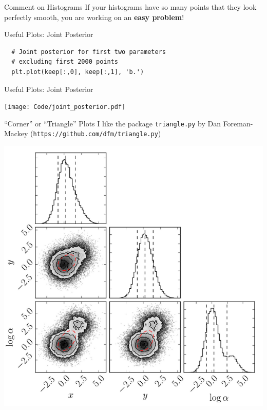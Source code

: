 \begin{frame}[t]{Comment on Histograms}
If your histograms have so many points that they look perfectly smooth, you
are working on an {\bf easy problem}!
\end{frame}


\begin{frame}[t, fragile]{Useful Plots: Joint Posterior}
\begin{verbatim}
  # Joint posterior for first two parameters
  # excluding first 2000 points
  plt.plot(keep[:,0], keep[:,1], 'b.')
\end{verbatim}
\end{frame}

\begin{frame}[t]{Useful Plots: Joint Posterior}
\begin{center}
\texttt{[image: Code/joint\_posterior.pdf]}
\end{center}
\end{frame}


\begin{frame}[t]{``Corner'' or ``Triangle'' Plots}
I like the package {\tt triangle.py} by Dan Foreman-Mackey
({\tt https://github.com/dfm/triangle.py})
\begin{center}
\includegraphics[scale=0.2]{triangle.png}
\end{center}
\end{frame}



